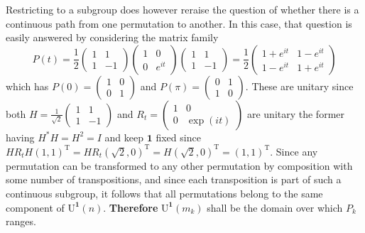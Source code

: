 \documentclass{article}
\newcommand{\transpose}[1]{#1^{\mathrm{T}}}
\newcommand{\vek}{\mathbf}
\newcommand{\UOne}{\mathrm{U}^{\vek{1}}}
\theoremstyle{definition}
\providecommand*{\Dash}{%
   \nobreak\hspace{0.166667em}\textemdash\hspace{0.166667em}%
}
\providecommand*{\Ldash}{%
   \hspace{0.166667em}\textemdash\nobreak\hspace{0.166667em}%
}
\providecommand*{\Rdash}{\Dash}
\begin{document}
Restricting to a subgroup does however reraise the question of 
whether there is a continuous path from one permutation to another. 
In this case, that question is easily answered by considering the 
matrix family
\begin{equation} \label{Eq:KontTransposition}
  P(t) 
  = 
  \frac{1}{2}
  \begin{pmatrix} 1 & 1 \\ 1 & -1 \end{pmatrix}
  \begin{pmatrix} 1 & 0  \\ 0 & e^{it} \end{pmatrix}
  \begin{pmatrix} 1 & 1 \\ 1 & -1 \end{pmatrix}
  =
  \frac{1}{2}
  \begin{pmatrix}
    1 + e^{it} & 1 - e^{it} \\
    1 - e^{it} & 1 + e^{it}
  \end{pmatrix}
\end{equation}
which has \(P(0) = \left( \begin{smallmatrix} 1&0 \\ 0&1 
\end{smallmatrix} \right)\) and \(P(\pi) = \left( 
\begin{smallmatrix} 0&1 \\ 1&0 \end{smallmatrix} \right)\). These are 
unitary since both \(H = \frac{1}{\sqrt{2}} \left( 
\begin{smallmatrix} 1&1 \\ 1&-1 \end{smallmatrix} \right)\) and 
\(R_t = \left( \begin{smallmatrix} 1&0 \\ 0&\exp(it) 
\end{smallmatrix} \right)\) are unitary\Ldash the former having \(H^* 
H = H^2 = I\)\Rdash and keep $\vek{1}$ fixed since 
\(H R_t H \transpose{(1,1)} = H R_t \transpose{(\sqrt{2},0)} = 
H \transpose{(\sqrt{2},0)} = \transpose{(1,1)}\). Since any 
permutation can be transformed to any other permutation by 
composition with some number of transpositions, and since each 
transposition is part of such a continuous subgroup, it follows that 
all permutations belong to the same component of $\UOne(n)$. 
\textbf{Therefore} $\UOne(m_k)$ shall be the domain over which $P_k$ 
ranges.
\end{document}
